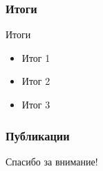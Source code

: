 \begin{frame}
    \frametitle{Итоги}
    {\Large Итоги}
    \medskip
    \begin{itemize}
    	\item Итог 1
        \item Итог 2
        \item Итог 3
    \end{itemize}
\end{frame}

\renewcommand*{\bibfont}{\footnotesize}
\begin{frame} %
	\frametitle{Публикации}

\end{frame}

\begin{frame} %
    \begin{center}
        \Huge
        Спасибо за внимание!
    \end{center}
        \makeend
\end{frame}
